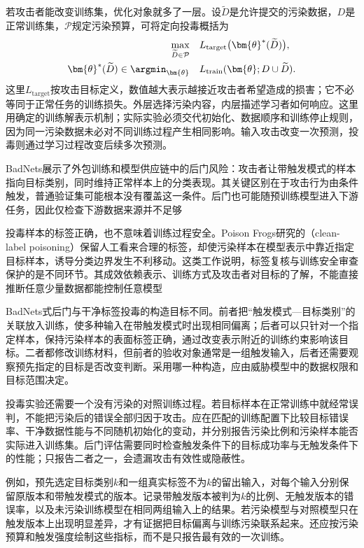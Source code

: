 若攻击者能改变训练集，优化对象就多了一层。设$\widetilde D$是允许提交的污染数据，$D$是正常训练集，$\mathcal P$规定污染预算，可将定向投毒概括为
\begin{equation}
 \begin{aligned}
 \max_{\widetilde D\in\mathcal P}\quad&
 L_{\mathrm{target}}\bigl(\bm{\theta}^{*}(\widetilde D)\bigr),\\
 \bm{\theta}^{*}(\widetilde D)\in\argmin_{\bm{\theta}}\quad&
 L_{\mathrm{train}}(\bm{\theta};D\cup\widetilde D).
 \end{aligned}
 \label{eq:security-poison-bilevel}
\end{equation}
这里$L_{\mathrm{target}}$按攻击目标定义，数值越大表示越接近攻击者希望造成的损害；它不必等同于正常任务的训练损失。外层选择污染内容，内层描述学习者如何响应。这里用确定的训练解表示机制；实际实验必须交代初始化、数据顺序和训练停止规则，因为同一污染数据未必对不同训练过程产生相同影响。输入攻击改变一次预测，投毒则通过学习过程改变后续多次预测。

BadNets展示了外包训练和模型供应链中的后门风险：攻击者让带触发模式的样本指向目标类别，同时维持正常样本上的分类表现。其关键区别在于攻击行为由条件触发，普通验证集可能根本没有覆盖这一条件。后门也可能随预训练模型进入下游任务，因此仅检查下游数据来源并不足够

投毒样本的标签正确，也不意味着训练过程安全。Poison Frogs研究的（clean-label poisoning）保留人工看来合理的标签，却使污染样本在模型表示中靠近指定目标样本，诱导分类边界发生不利移动。这类工作说明，标签复核与训练安全审查保护的是不同环节。其成效依赖表示、训练方式及攻击者对目标的了解，不能直接推断任意少量数据都能控制任意模型

BadNets式后门与干净标签投毒的构造目标不同。前者把“触发模式—目标类别”的关联放入训练，使多种输入在带触发模式时出现相同偏离；后者可以只针对一个指定样本，保持污染样本的表面标签正确，通过改变表示附近的训练约束影响该目标。二者都修改训练材料，但前者的验收对象通常是一组触发输入，后者还需要观察预先指定的目标是否改变判断。采用哪一种构造，应由威胁模型中的数据权限和目标范围决定。

投毒实验还需要一个没有污染的对照训练过程。若目标样本在正常训练中就经常误判，不能把污染后的错误全部归因于攻击。应在匹配的训练配置下比较目标错误率、干净数据性能与不同随机初始化的变动，并分别报告污染比例和污染样本能否实际进入训练集。后门评估需要同时检查触发条件下的目标成功率与无触发条件下的性能；只报告二者之一，会遗漏攻击有效性或隐蔽性。

例如，预先选定目标类别$k$和一组真实标签不为$k$的留出输入，对每个输入分别保留原版本和带触发模式的版本。记录带触发版本被判为$k$的比例、无触发版本的错误率，以及未污染训练模型在相同两组输入上的结果。若污染模型与对照模型只在触发版本上出现明显差异，才有证据把目标偏离与训练污染联系起来。还应按污染预算和触发强度绘制这些指标，而不是只报告最有效的一次训练。

